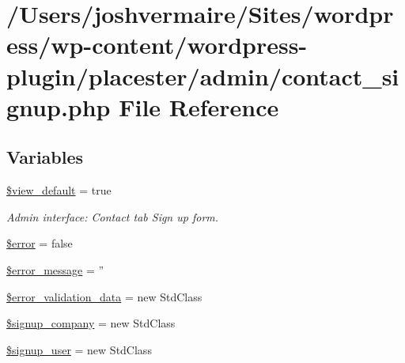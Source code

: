 \hypertarget{contact__signup_8php}{
\section{/Users/joshvermaire/Sites/wordpress/wp-\/content/wordpress-\/plugin/placester/admin/contact\_\-signup.php File Reference}
\label{d0/d1f/contact__signup_8php}
}
\subsection*{Variables}
\begin{DoxyCompactItemize}
\item 
\hyperlink{contact__signup_8php_a070b05dad33b685eaa9aa435cf15a698}{\$view\_\-default} = true
\begin{DoxyCompactList}\small\item\em Admin interface: Contact tab Sign up form. \end{DoxyCompactList}\item 
\hyperlink{contact__signup_8php_aeba2ab722cedda53dbb7ec1a59f45550}{\$error} = false
\item 
\hyperlink{contact__signup_8php_ae838cbd355959defbd4d49d0fbe7b273}{\$error\_\-message} = ''
\item 
\hyperlink{contact__signup_8php_ae9bd679c49b80e9f12a3c0c90ff0e5c3}{\$error\_\-validation\_\-data} = new StdClass
\item 
\hyperlink{contact__signup_8php_a69c0c79c823bc5de38f0388e6952db1d}{\$signup\_\-company} = new StdClass
\item 
\hyperlink{contact__signup_8php_a80054d37785a54a1e36c58c390cce119}{\$signup\_\-user} = new StdClass
\end{DoxyCompactItemize}


